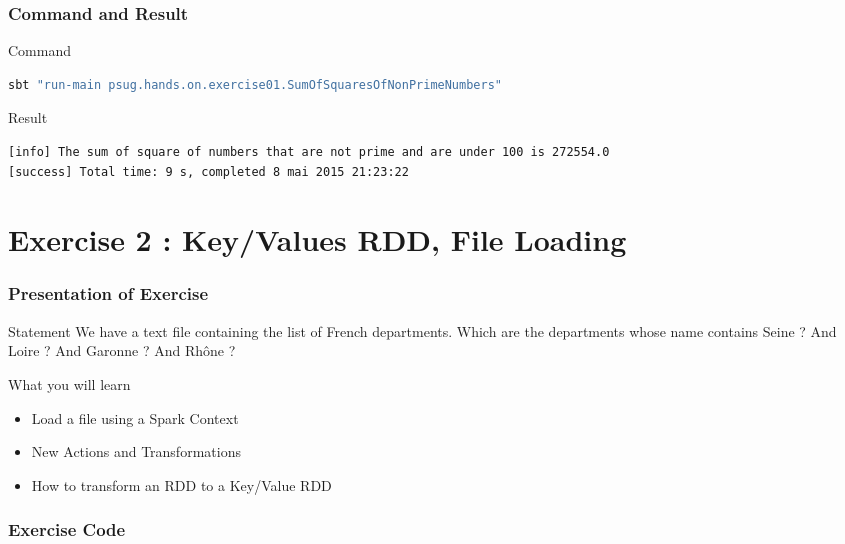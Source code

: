 \documentclass[slidetop,9pt,utf8]{beamer}
\begin{document}
\begin{CJK}{UTF8}{gbsn}
\begin{frame}
\end{frame}

\begin{frame}[fragile]
  \frametitle{Command and Result}

  \begin{block}{Command}
    \begin{lstlisting}[language=bash, style=terminal]
sbt "run-main psug.hands.on.exercise01.SumOfSquaresOfNonPrimeNumbers"
    \end{lstlisting}
  \end{block}

  \begin{block}{Result}
    \begin{lstlisting}[language=bash, style=terminal]
[info] The sum of square of numbers that are not prime and are under 100 is 272554.0
[success] Total time: 9 s, completed 8 mai 2015 21:23:22
    \end{lstlisting}
  \end{block}

\end{frame}

\section{Exercise 2 : Key/Values RDD, File Loading}

\begin{frame}
  \frametitle{Presentation of Exercise}

  \begin{block}{Statement}
    We have a text file containing the list of French departments. Which are the departments whose name contains Seine ? And Loire ? And Garonne ? And Rhône ?
  \end{block}

  \begin{block}{What you will learn}
    \begin{itemize}
      \item Load a file using a Spark Context
      \item New Actions and Transformations
      \item How to transform an RDD to a Key/Value RDD
    \end{itemize}
  \end{block}

\end{frame}

\begin{frame}
  \frametitle{Exercise Code}


\end{frame}
\end{CJK}
\end{document}
